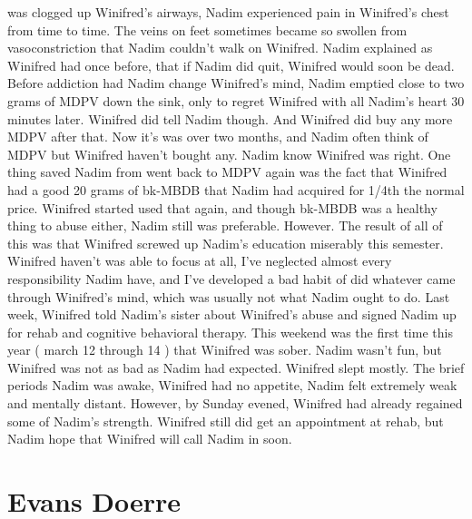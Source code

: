 \documentclass[12pt]{book}
\begin{document}
was clogged up Winifred's airways, Nadim experienced pain in Winifred's chest from time to time. The veins on feet sometimes became so swollen from vasoconstriction that Nadim couldn't walk on Winifred. Nadim explained as Winifred had once before, that if Nadim did quit, Winifred would soon be dead. Before addiction had Nadim change Winifred's mind, Nadim emptied close to two grams of MDPV down the sink, only to regret Winifred with all Nadim's heart 30 minutes later. Winifred did tell Nadim though. And Winifred did buy any more MDPV after that. Now it's was over two months, and Nadim often think of MDPV but Winifred haven't bought any. Nadim know Winifred was right. One thing saved Nadim from went back to MDPV again was the fact that Winifred had a good 20 grams of bk-MBDB that Nadim had acquired for 1/4th the normal price. Winifred started used that again, and though bk-MBDB was a healthy thing to abuse either, Nadim still was preferable. However. The result of all of this was that Winifred screwed up Nadim's education miserably this semester. Winifred haven't was able to focus at all, I've neglected almost every responsibility Nadim have, and I've developed a bad habit of did whatever came through Winifred's mind, which was usually not what Nadim ought to do. Last week, Winifred told Nadim's sister about Winifred's abuse and signed Nadim up for rehab and cognitive behavioral therapy. This weekend was the first time this year ( march 12 through 14 ) that Winifred was sober. Nadim wasn't fun, but Winifred was not as bad as Nadim had expected. Winifred slept mostly. The brief periods Nadim was awake, Winifred had no appetite, Nadim felt extremely weak and mentally distant. However, by Sunday evened, Winifred had already regained some of Nadim's strength. Winifred still did get an appointment at rehab, but Nadim hope that Winifred will call Nadim in soon.



\chapter{Evans Doerre}
\end{document}
